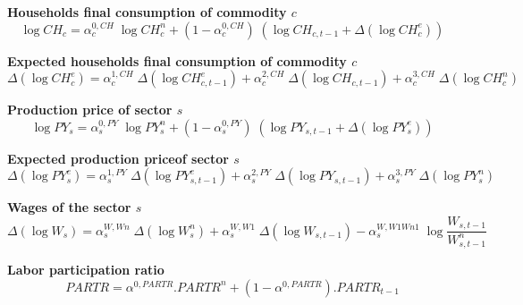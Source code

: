 \documentclass[12pt]{article}
\numberwithin{equation}{section}
\begin{document}
\noindent\textbf{Households final consumption of commodity $c$} \\
\begin{dmath}
\operatorname{log} CH_{c} = \alpha^{{0},CH}_{c} \; \operatorname{log} CH^{n}_{c} + \left( 1 - \alpha^{{0},CH}_{c} \right) \; \left( \operatorname{log} CH_{c, t-1} + \varDelta \left(\operatorname{log} CH^{e}_{c}\right) \right)
\end{dmath}

\noindent\textbf{Expected households final consumption of commodity $c$} \\
\begin{dmath}
\varDelta \left(\operatorname{log} CH^{e}_{c}\right) = \alpha^{{1},CH}_{c} \; \varDelta \left(\operatorname{log} CH^{e}_{c, t-1}\right) + \alpha^{{2},CH}_{c} \; \varDelta \left(\operatorname{log} CH_{c, t-1}\right) + \alpha^{{3},CH}_{c} \; \varDelta \left(\operatorname{log} CH^{n}_{c}\right)
\end{dmath}

\noindent\textbf{Production price of sector $s$} \\
\begin{dmath}
\operatorname{log} PY_{s} = \alpha^{{0},PY}_{s} \; \operatorname{log} PY^{n}_{s} + \left( 1 - \alpha^{{0},PY}_{s} \right) \; \left( \operatorname{log} PY_{s, t-1} + \varDelta \left(\operatorname{log} PY^{e}_{s}\right) \right)
\end{dmath}

\noindent\textbf{Expected production priceof sector $s$} \\
\begin{dmath}
\varDelta \left(\operatorname{log} PY^{e}_{s}\right) = \alpha^{{1},PY}_{s} \; \varDelta \left(\operatorname{log} PY^{e}_{s, t-1}\right) + \alpha^{{2},PY}_{s} \; \varDelta \left(\operatorname{log} PY_{s, t-1}\right) + \alpha^{{3},PY}_{s} \; \varDelta \left(\operatorname{log} PY^{n}_{s}\right)
\end{dmath}

\noindent\textbf{Wages of the sector $s$} \\
\begin{dmath}
\varDelta \left(\operatorname{log} W_{s}\right) = \alpha^{W,Wn}_{s} \; \varDelta \left(\operatorname{log} W^{n}_{s}\right) + \alpha^{W,W1}_{s} \; \varDelta \left(\operatorname{log} W_{s, t-1}\right) - \alpha^{W,W1Wn1}_{s} \; \operatorname{log} \frac{W_{s, t-1}}{W^{n}_{s, t-1}}
\end{dmath}

\noindent\textbf{Labor participation ratio} \\
\begin{dmath}
PARTR = \alpha^{{0},PARTR} . PARTR^{n} + \left( 1 - \alpha^{{0},PARTR} \right) . PARTR_{t-1}
\end{dmath}
\end{document}
